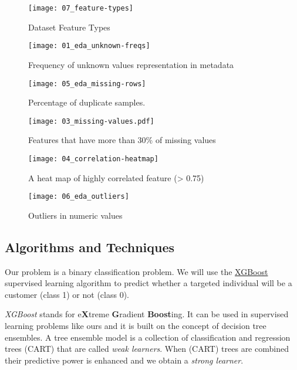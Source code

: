 \documentclass[a4paper]{article}
\begin{document}
{    \begin{figure}[H]
      \centering
      \caption{Dataset Feature Types}
      \label{fig:feature-types}
      \texttt{[image: 07\_feature-types]}
    \end{figure}
    \begin{figure}[H]
      \centering
      \caption{Frequency of unknown values representation in metadata}
      \label{fig:dataset-hbar}
      \texttt{[image: 01\_eda\_unknown-freqs]}
    \end{figure}
    \begin{figure}[H]
      \centering
      \caption{Percentage of duplicate samples.}
      \label{fig:duplicate-percent}
      \texttt{[image: 05\_eda\_missing-rows]}
    \end{figure}
    \begin{figure}[H]
      \centering
      \caption{Features that have more than 30\% of missing values}
      \label{fig:missing-values}
      \texttt{[image: 03\_missing-values.pdf]}
    \end{figure}
    \begin{figure}[H]
      \centering
      \caption{A heat map of highly correlated feature (> 0.75)}
      \label{fig:correlation-heatmap}
      \texttt{[image: 04\_correlation-heatmap]}
    \end{figure}
    \begin{figure}[H]
      \centering
      \caption{Outliers in numeric values}
      \label{fig:outliers-numeric}
      \texttt{[image: 06\_eda\_outliers]}
    \end{figure}


    \subsection{Algorithms and Techniques}
    Our problem is a binary classification problem. We will use the \href{https://xgboost.readthedocs.io/}{XGBoost} supervised learning algorithm  \cite{friedman_greedy_2000} to predict whether a targeted individual will be a customer (class 1) or not (class 0).

    \emph{XGBoost} stands for e\textbf{X}treme \textbf{G}radient \textbf{Boost}ing. It can be used in supervised learning problems like ours and it is built on the concept of decision tree ensembles. A tree ensemble model is a collection of classification and regression trees (CART) that are called \emph{weak learners}. When (CART) trees are combined their predictive power is enhanced and we obtain a \emph{strong learner}.

}
\end{document}
